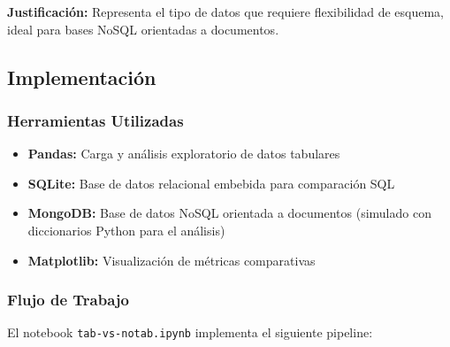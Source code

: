 \documentclass[12pt]{src/formato_utem}
\begin{document}
\textbf{Justificación:} Representa el tipo de datos que requiere flexibilidad de esquema, ideal para bases NoSQL orientadas a documentos.

\subsection*{Implementación}

\subsubsection*{Herramientas Utilizadas}

\begin{itemize}
    \item \textbf{Pandas:} Carga y análisis exploratorio de datos tabulares
    \item \textbf{SQLite:} Base de datos relacional embebida para comparación SQL
    \item \textbf{MongoDB:} Base de datos NoSQL orientada a documentos (simulado con diccionarios Python para el análisis)
    \item \textbf{Matplotlib:} Visualización de métricas comparativas
\end{itemize}

\subsubsection*{Flujo de Trabajo}

El notebook \texttt{tab-vs-notab.ipynb} implementa el siguiente pipeline:
\end{document}
